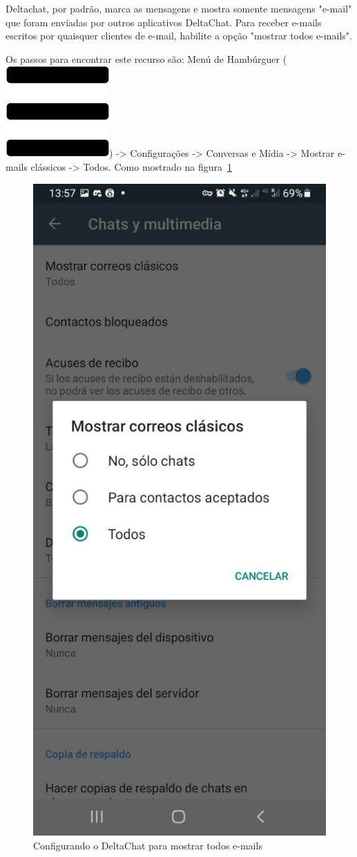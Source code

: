 \documentclass[11pt,a4paper]{article}
\begin{document}
Deltachat, por padrão, marca as mensagens e mostra somente mensagens "e-mail" que foram enviadas por outros aplicativos DeltaChat. Para receber e-mails escritos por quaisquer clientes de e-mail, habilite a opção "mostrar todos e-mails".


Os passos para encontrar este recurso são: Menú de Hambúrguer (\includegraphics[height=0.78\baselineskip]{pictures/burger.png}) -> Configurações -> Conversas e Mídia -> Mostrar e-mails clássicos -> Todos. Como mostrado na figura~\ref{fig:deltachat-allemails} 


\begin{figure}[H]
    \centering
    \includegraphics[width=0.3\columnwidth]{screenshots/deltachat/es/allemails_es.jpeg}
    	\caption{Configurando o DeltaChat para mostrar todos e-mails}
	\vspace{-10pt}
    \label{fig:deltachat-allemails}
\end{figure}
\end{document}
